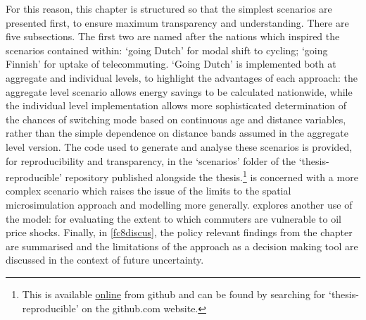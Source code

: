 For this reason, this chapter is structured so that the simplest 
scenarios are presented first, to ensure maximum transparency and
understanding.
There are
five subsections.
The first two are named after the nations which inspired the 
scenarios contained within: `going Dutch' for modal shift to cycling;
`going Finnish' for uptake of telecommuting.
`Going Dutch' is implemented both at aggregate and individual levels,
to highlight the advantages of each approach: the aggregate level
scenario allows energy savings to be calculated nationwide, while the
individual level implementation allows more sophisticated determination
of the chances of switching mode based on continuous age and distance
variables, rather than the simple dependence on distance bands
assumed in the aggregate level version. The code used to generate and analyse
these scenarios is provided, for reproducibility and transparency, in the
`scenarios' folder of the `thesis-reproducible' repository published alongside
the thesis.\footnote{This is
available
{\color{blue}\href{https://github.com/Robinlovelace/thesis-reproducible}{online}
} from github and can be found by searching for
`thesis-reproducible' on the github.com website.}
 is concerned
with a more complex scenario which raises the issue of the limits to the
spatial microsimulation approach and modelling more generally. 
explores another use of the model: for evaluating the
extent to which commuters are vulnerable to oil price shocks. Finally, in
\cref{fc8discus}, the policy relevant findings from the chapter are summarised
and the limitations of the approach as a decision making
tool are discussed in the context of future uncertainty.

